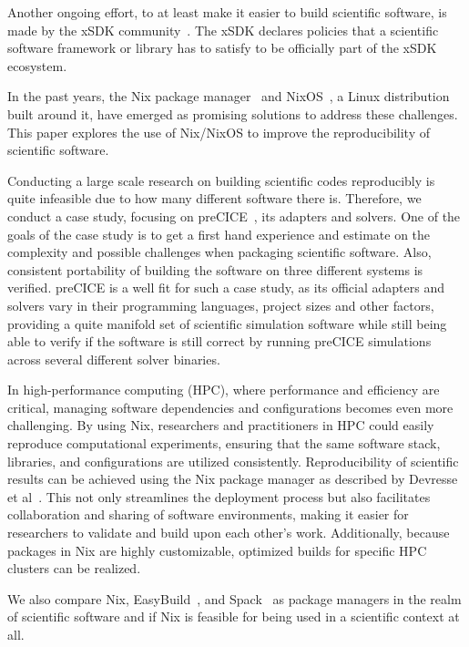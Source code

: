\documentclass{eceasst}
\begin{document}
Another ongoing effort, to at least make it easier to build scientific software, is made by the xSDK community~\cite{xSDK2023}.
The xSDK declares policies that a scientific software framework or library has to satisfy to be officially part of the xSDK ecosystem.

In the past years, the Nix package manager~\cite{Dolstra_2004} and NixOS~\cite{Dolstra_2010}, a Linux distribution built around it, have emerged as promising solutions to address these challenges.
This paper explores the use of Nix/NixOS to improve the reproducibility of scientific software.

Conducting a large scale research on building scientific codes reproducibly is quite infeasible due to how many different software there is.
Therefore, we conduct a case study, focusing on preCICE~\cite{preCICEv2}, its adapters and solvers.
One of the goals of the case study is to get a first hand experience and estimate on the complexity and possible challenges when packaging scientific software.
Also, consistent portability of building the software on three different systems is verified.
preCICE is a well fit for such a case study, as its official adapters and solvers vary in their programming languages, project sizes and other factors, providing a quite manifold set of scientific simulation software while still being able to verify if the software is still correct by running preCICE simulations across several different solver binaries.

In high-performance computing (HPC), where performance and efficiency are critical, managing software dependencies and configurations becomes even more challenging.
By using Nix, researchers and practitioners in HPC could easily reproduce computational experiments, ensuring that the same software stack, libraries, and configurations are utilized consistently.
Reproducibility of scientific results can be achieved using the Nix package manager as described by Devresse et al~\cite{Devresse_2015}.
This not only streamlines the deployment process but also facilitates collaboration and sharing of software environments, making it easier for researchers to validate and build upon each other's work.
Additionally, because packages in Nix are highly customizable, optimized builds for specific HPC clusters can be realized.

We also compare Nix, EasyBuild~\cite{easybuil6495863}, and Spack~\cite{spack7832814} as package managers in the realm of scientific software and if Nix is feasible for being used in a scientific context at all.
\end{document}
